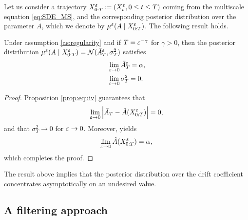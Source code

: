 \documentclass[10pt]{article}
\begin{document}
Let us consider a trajectory $X_{0:T}^\varepsilon \coloneqq (X_t^\varepsilon, 0 \leq t \leq T)$ coming from the multiscale equation \eqref{eq:SDE_MS}, and the corresponding posterior distribution over the parameter $A$, which we denote by $\mu^\varepsilon(A \mid X_{0:T}^\varepsilon)$. The following result holds.
\begin{theorem} Under assumption \ref{as:regularity} and if $T = \varepsilon^{-\gamma}$ for $\gamma > 0$, then the posterior distribution $\mu^\varepsilon(A \mid X_{0:T}^\varepsilon) = \mathcal N(\bar A^\varepsilon_T,  \sigma^2_T)$ satisfies
	\begin{equation}
	\begin{aligned}
		&\lim_{\varepsilon \to 0} \bar A^\varepsilon_T = \alpha, \\
		&\lim_{\varepsilon \to 0} \sigma^2_T = 0.
	\end{aligned}
	\end{equation}
\end{theorem}
\begin{proof} Proposition \ref{prop:equiv} guarantees that 
	\begin{equation}
		\lim_{\varepsilon \to 0} \left\lvert\bar A_T - \hat A(X^\varepsilon_{0:T})\right\rvert = 0,
	\end{equation}
	and that $\sigma^2_T \to 0$ for $\varepsilon \to 0$. Moreover, \cite[Theorem 3.4]{PaS07} yields
	\begin{equation}
		\lim_{\varepsilon \to 0} \hat A(X^\varepsilon_{0:T}) = \alpha,
	\end{equation}
	which completes the proof.
\end{proof}

The result above implies that the posterior distribution over the drift coefficient concentrates asymptotically on an undesired value.

\subsection{A filtering approach}
\end{document}
